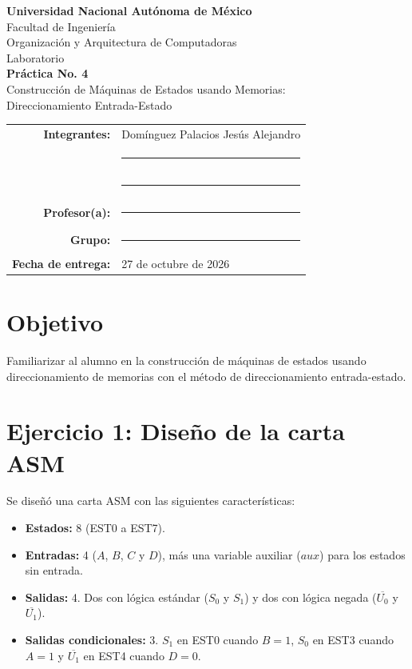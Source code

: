 \documentclass[11pt,letterpaper]{article}
\newcommand{\nb}[1]{\overline{#1}}
\begin{document}
\begin{titlepage}
\centering
{\Large\textbf{Universidad Nacional Autónoma de México}}\\[0.3cm]
{\large Facultad de Ingeniería}\\[1.5cm]
{\large Organización y Arquitectura de Computadoras}\\[0.3cm]
{\large Laboratorio}\\[2cm]
{\LARGE\textbf{Práctica No. 4}}\\[0.5cm]
{\Large Construcción de Máquinas de Estados usando Memorias:\\[0.2cm] Direccionamiento Entrada-Estado}\\[2.5cm]
\begin{tabular}{rl}
\textbf{Integrantes:} & Domínguez Palacios Jesús Alejandro \\
 & \rule{7cm}{0.4pt} \\
 & \rule{7cm}{0.4pt} \\[0.4cm]
\textbf{Profesor(a):} & \rule{7cm}{0.4pt} \\[0.4cm]
\textbf{Grupo:} & \rule{3cm}{0.4pt} \\[0.4cm]
\textbf{Fecha de entrega:} & 27 de octubre de 2026
\end{tabular}
\vfill
\end{titlepage}

\section{Objetivo}
Familiarizar al alumno en la construcción de máquinas de estados usando direccionamiento de memorias con el método de direccionamiento entrada-estado.

\section{Ejercicio 1: Diseño de la carta ASM}

Se diseñó una carta ASM con las siguientes características:

\begin{itemize}
  \item \textbf{Estados:} 8 (EST0 a EST7).
  \item \textbf{Entradas:} 4 ($A$, $B$, $C$ y $D$), más una variable auxiliar ($aux$) para los estados sin entrada.
  \item \textbf{Salidas:} 4. Dos con lógica estándar ($S_0$ y $S_1$) y dos con lógica negada ($\nb{U_0}$ y $\nb{U_1}$).
  \item \textbf{Salidas condicionales:} 3. $S_1$ en EST0 cuando $B=1$, $S_0$ en EST3 cuando $A=1$ y $\nb{U_1}$ en EST4 cuando $D=0$.
\end{itemize}
\end{document}
